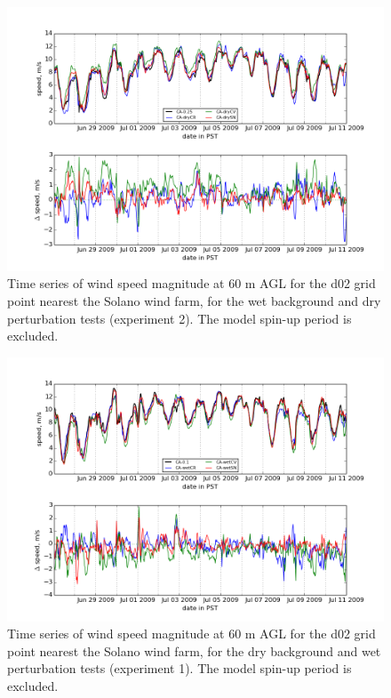 \begin{figure}[here]
\includegraphics[width=1\textwidth]{ch3-wind/img/solano_wind_wetbkd_dryrg_d02_level0.png}
\caption{Time series of wind speed magnitude at 60 m AGL for the d02 grid point nearest the Solano wind farm, for the wet background and dry perturbation tests (experiment 2).  The model spin-up period is excluded.}
\label{fig:windSol_TseriesDryRg}
\end{figure}

\begin{figure}[here]
\includegraphics[width=1\textwidth]{ch3-wind/img/solano_wind_drybkd_wetrg_d02_level0.png}
\caption{Time series of wind speed magnitude at 60 m AGL for the d02 grid point nearest the Solano wind farm, for the dry background and wet perturbation tests (experiment 1).  The model spin-up period is excluded.}
\label{fig:windSol_TseriesWetRg}
\end{figure}

